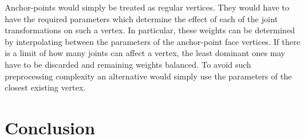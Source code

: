 \documentclass[a4paper, 12pt]{article}
\begin{document}
Anchor-points would simply be treated as regular vertices. They would have to have the required parameters which determine the effect of each of the joint transformations on such a vertex. In particular, these weights can be determined by interpolating between the parameters of the anchor-point face vertices. If there is a limit of how many joints can affect a vertex, the least dominant ones may have to be discarded and remaining weights balanced. To avoid such preprocessing complexity an alternative would simply use the parameters of the closest existing vertex.



\section{Conclusion}
\end{document}
